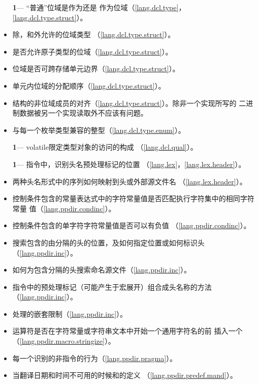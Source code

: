 \begin{itemize} %
  \item[\textbf{1}\hspace{5pt}---]{``普通''位域是作为还是
    作为位域（\ref{lang.dcl.type}，
    \ref{lang.dcl.type.struct}）。}
  \item{除，和外允许的位域类型
    （\ref{lang.dcl.type.struct}）。}
  \item{是否允许原子类型的位域（\ref{lang.dcl.type.struct}）。}
  \item{位域是否可跨存储单元边界（\ref{lang.dcl.type.struct}）。}
  \item{单元内位域的分配顺序（\ref{lang.dcl.type.struct}）。}
  \item{结构的非位域成员的对齐（\ref{lang.dcl.type.struct}）。除非一个实现所写的
    二进制数据被另一个实现读取外不应该有问题。}
  \item{与每一个枚举类型兼容的整型（\ref{lang.dcl.type.enum}）。}
\end{itemize}

\begin{itemize}
  \item[\textbf{1}\hspace{5pt}---]{volatile限定类型对象的访问的构成
    （\ref{lang.dcl.qual}）。}
\end{itemize}

\begin{itemize} %
  \item[\textbf{1}\hspace{5pt}---]{指令中，识别头名预处理标记的位置
    （\ref{lang.lex}，\ref{lang.lex.header}）。}
  \item{两种头名形式中的序列如何映射到头或外部源文件名
    （\ref{lang.lex.header}）。}
  \item{控制条件包含的常量表达式中的字符常量值是否匹配执行字符集中的相同字符常量
    值（\ref{lang.ppdir.condinc}）。}
  \item{控制条件包含的单字符字符常量值是否可以有负值
    （\ref{lang.ppdir.condinc}）。}
  \item{搜索包含的由\tm{< >}分隔的头的位置，及如何指定位置或如何标识头
    （\ref{lang.ppdir.inc}）。}
  \item{如何为包含\tm{\dq \dq}分隔的头搜索命名源文件（\ref{lang.ppdir.inc}）。}
  \item{指令中的预处理标记（可能产生于宏展开）组合成头名称的方法
    （\ref{lang.ppdir.inc}）。}
  \item{处理的嵌套限制（\ref{lang.ppdir.inc}）。}
  \item{\tm{\#}运算符是否在字符常量或字符串文本中开始一个通用字符名的\tm{\bs}前
    插入一个\tm{\bs}（\ref{lang.ppdir.macro.stringize}）。}
  \item{每一个识别的非指令的行为（\ref{lang.ppdir.pragma}）。}
  \item{当翻译日期和时间不可用的时候和的定义
    （\ref{lang.ppdir.predef.mand}）。}
\end{itemize}

